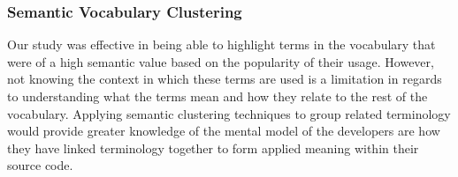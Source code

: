 \subsubsection{Semantic Vocabulary Clustering} %
\label{ssub:semantic_vocabulary_clustering}

Our study was effective in being able to highlight terms in the vocabulary that were of a high semantic value based on the popularity of their usage. However, not knowing the context in which these terms are used is a limitation in regards to understanding what the terms mean and how they relate to the rest of the vocabulary. Applying semantic clustering techniques to group related terminology would provide greater knowledge of the mental model of the developers are how they have linked terminology together to form applied meaning within their source code.


